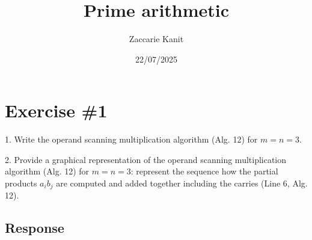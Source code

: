 \documentclass{article}
\author{Zaccarie Kanit}
\date{22/07/2025}
\title{Prime arithmetic}
\begin{document}
\maketitle

\section*{Exercise \#1}

1. Write the operand scanning multiplication algorithm (Alg. 12) for $m=n=3$.

2. Provide a graphical representation of the operand scanning multiplication algorithm  (Alg. 12) for $m=n=3$: represent the sequence how the partial products
$a_ib_j$ are computed and added together including the carries (Line 6, Alg. 12).

\subsection*{Response}
\end{document}
